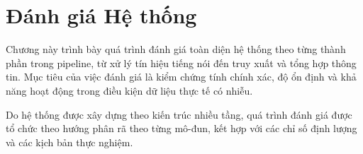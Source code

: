 \section{Đánh giá Hệ thống}

Chương này trình bày quá trình đánh giá toàn diện hệ thống theo từng thành phần trong pipeline, từ xử lý tín hiệu tiếng nói đến truy xuất và tổng hợp thông tin. Mục tiêu của việc đánh giá là kiểm chứng tính chính xác, độ ổn định và khả năng hoạt động trong điều kiện dữ liệu thực tế có nhiễu.

Do hệ thống được xây dựng theo kiến trúc nhiều tầng, quá trình đánh giá được tổ chức theo hướng phân rã theo từng mô-đun, kết hợp với các chỉ số định lượng và các kịch bản thực nghiệm.